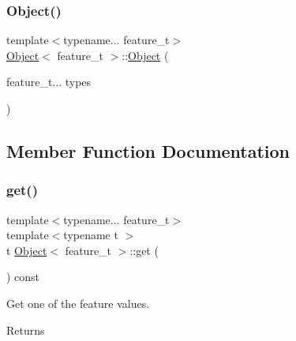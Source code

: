 \mbox{\label{struct_object_a41263b3773ab834bce3237371e69f429}} 
\subsubsection{\texorpdfstring{Object()}{Object()}\hspace{0.1cm}{\footnotesize\ttfamily [2/2]}}
{\footnotesize\ttfamily template$<$typename... feature\+\_\+t$>$ \\
\hyperlink{struct_object}{Object}$<$ feature\+\_\+t $>$\+::\hyperlink{struct_object}{Object} (\begin{DoxyParamCaption}\item[{feature\+\_\+t...}]{types }\end{DoxyParamCaption})\hspace{0.3cm}{\ttfamily [inline]}}



\subsection{Member Function Documentation}
\mbox{\label{struct_object_a380e8d879bd922eedbf3c6aabcd64a61}} 
\subsubsection{\texorpdfstring{get()}{get()}}
{\footnotesize\ttfamily template$<$typename... feature\+\_\+t$>$ \\
template$<$typename t $>$ \\
t \hyperlink{struct_object}{Object}$<$ feature\+\_\+t $>$\+::get (\begin{DoxyParamCaption}{ }\end{DoxyParamCaption}) const\hspace{0.3cm}{\ttfamily [inline]}}



Get one of the feature values. 

\begin{DoxyReturn}{Returns}

\end{DoxyReturn}
\mbox{\label{struct_object_a7ced49ee95a75ef440d3c2934c6485e0}} 
